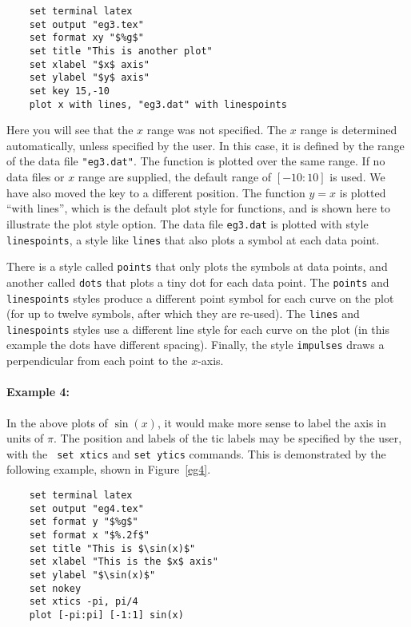 \singlespace
\begin{verbatim}
    set terminal latex
    set output "eg3.tex"
    set format xy "$%g$"
    set title "This is another plot"
    set xlabel "$x$ axis"
    set ylabel "$y$ axis"
    set key 15,-10
    plot x with lines, "eg3.dat" with linespoints
\end{verbatim}
\currentspace


Here you will see that the $x$ range was not specified. The $x$ range
is determined automatically, unless specified by the user.  In
this case, it is defined by the range of the data file
\verb+"eg3.dat"+. The function is plotted over the same range. If no
data files or $x$ range are supplied, the default range of $[-10:10]$
is used. We have also moved the key to a different position.  The
function $y=x$ is plotted ``with lines'', which is the default plot
style for functions, and is shown here to illustrate the plot style
option.  The data file {\tt eg3.dat} is plotted with style {\tt
linespoints}, a style like {\tt lines} that also plots a symbol at
each data point.

There is a style called {\tt points} that only plots the symbols at
data points, and another called {\tt dots} that plots a tiny dot for
each data point.  The {\tt points} and {\tt linespoints} styles
produce a different point symbol for each curve on the plot (for up to
twelve symbols, after which they are re-used). The {\tt lines} and
{\tt linespoints} styles use a different line style for each curve on
the plot (in this example the dots have different spacing). Finally,
the style {\tt impulses} draws a perpendicular from each point to the
$x$-axis.

\paragraph{Example 4:} In the above plots of $\sin(x)$, it would make
more sense to label the axis in units of $\pi$. The position and
labels of the tic labels may be specified by the user, with the {\tt
set xtics} and {\tt set ytics} commands. This is demonstrated by
the following example, shown in Figure~\ref{eg4}.

\singlespace
\begin{verbatim}
    set terminal latex
    set output "eg4.tex"
    set format y "$%g$"
    set format x "$%.2f$"
    set title "This is $\sin(x)$"
    set xlabel "This is the $x$ axis"
    set ylabel "$\sin(x)$"
    set nokey
    set xtics -pi, pi/4
    plot [-pi:pi] [-1:1] sin(x)
\end{verbatim}
\currentspace

